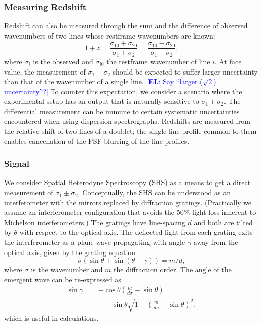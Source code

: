 \documentclass[preprint2, 10pt]{aastex}
\newcommand{\eric}[1]{\textcolor{blue}{[{\bf EL}: #1]}}
\begin{document}
\subsubsection{Measuring Redshift}
Redshift can also be measured through the sum and the difference of observed wavenumbers of two lines whose restframe wavenumbers are known:
\begin{equation}
1+z=\frac{\sigma_{10}+\sigma_{20}}{\sigma_{1}+\sigma_{2}}=\frac{\sigma_{10}-\sigma_{20}}{\sigma_{1}-\sigma_{2}},
\label{redshift:eqn}
\end{equation}
where $\sigma_i$ is the observed and $\sigma_{i0}$ the restframe wavenumber of line $i$.
At face value, the measurement of $\sigma_1\pm\sigma_2$ should be expected to suffer larger uncertainty than that of the wavenumber
of a single line.  
\eric{Say ``larger ($\sqrt{2}$) uncertainty''?} 
To counter this expectation, we consider a scenario where the experimental setup has an output that is naturally sensitive
to $\sigma_1\pm\sigma_2$.  The differential measurement can be immune to certain systematic uncertainties encountered when using dispersion spectrographs.
Redshifts are measured from the relative shift of two lines of a doublet; 
the single line profile common to them enables cancellation of the PSF blurring of the
line profiles.


\subsubsection{Signal}

We consider Spatial Heterodyne Spectroscopy (SHS) \citep{1990SPIE.1235..622H}
as a means to get a direct measurement of  $\sigma_1\pm\sigma_2$.
Conceptually, the SHS can be understood as an interferometer with the  mirrors replaced by diffraction gratings.
(Practically we assume an interferometer configuration that  avoids the 50\% light loss inherent to  Michelson interferometers.)
The gratings have line-spacing $d$ and both are tilted
by $\theta$ with respect to the optical axis.  The deflected light from each grating exits the interferometer as a plane wave
propagating with angle $\gamma$ away from the optical axis,  given by the grating equation
\begin{equation}
\sigma\left(\sin{\theta}+\sin{\left(\theta-\gamma\right)}\right)=m/d,
\end{equation}
where $\sigma$ is the wavenumber and $m$ the diffraction order.
The angle of the emergent wave can be re-expressed as
\begin{align}
\sin{\gamma} & =-\cos{\theta} \left(\frac{m}{d\sigma} - \sin{\theta} \right) \nonumber \\
& \qquad + \sin{\theta}\sqrt{1-\left(\frac{m}{d\sigma} -\sin{\theta} \right)^2},
\end{align}
which is useful in calculations.
\end{document}

